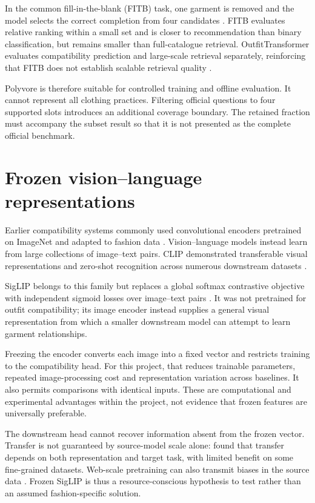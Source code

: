 In the common fill-in-the-blank (FITB) task, one garment is removed and the
model selects the correct completion from four candidates
\parencite{han2017bilstm,vasileva2018typeaware}. FITB evaluates relative ranking
within a small set and is closer to recommendation than binary classification,
but remains smaller than full-catalogue retrieval. OutfitTransformer evaluates
compatibility prediction and large-scale retrieval separately, reinforcing
that FITB does not establish scalable retrieval quality
\parencite{sarkar2023outfittransformer}.

Polyvore is therefore suitable for controlled training and offline evaluation.
It cannot represent all clothing practices. Filtering official questions to
four supported slots introduces an additional coverage boundary. The retained
fraction must accompany the subset result so that it is not presented as the
complete official benchmark.

\section{Frozen vision--language representations}

Earlier compatibility systems commonly used convolutional encoders pretrained
on ImageNet and adapted to fashion data \parencite{vasileva2018typeaware}.
Vision--language models instead learn from large collections of image--text
pairs. CLIP demonstrated transferable visual representations and zero-shot
recognition across numerous downstream datasets \parencite{radford2021clip}.

SigLIP belongs to this family but replaces a global softmax contrastive
objective with independent sigmoid losses over image--text pairs
\parencite{zhai2023siglip}. It was not pretrained for outfit compatibility; its
image encoder instead supplies a general visual representation from which a
smaller downstream model can attempt to learn garment relationships.

Freezing the encoder converts each image into a fixed vector and restricts
training to the compatibility head. For this project, that reduces trainable
parameters, repeated image-processing cost and representation variation across
baselines. It also permits comparisons with identical inputs. These are
computational and experimental advantages within the project, not evidence
that frozen features are universally preferable.

The downstream head cannot recover information absent from the frozen vector.
Transfer is not guaranteed by source-model scale alone:
\textcite{kornblith2019transfer} found that transfer depends on both
representation and target task, with limited benefit on some fine-grained
datasets. Web-scale pretraining can also transmit biases in the source data
\parencite{radford2021clip,mehrabi2021bias}. Frozen SigLIP is thus a
resource-conscious hypothesis to test rather than an assumed fashion-specific
solution.

